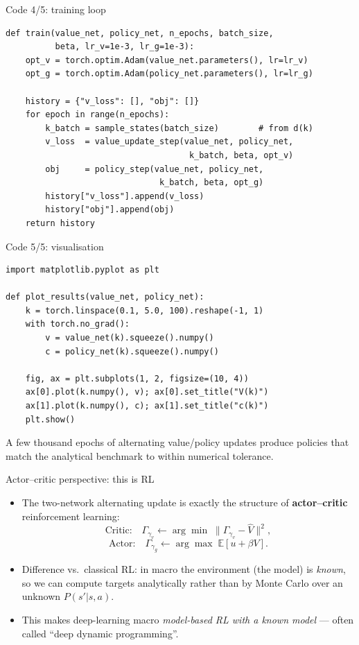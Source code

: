 \documentclass[10pt,english,aspectratio=169]{beamer}
\begin{document}
\begin{frame}[fragile]{Code 4/5: training loop}
\begin{lstlisting}
def train(value_net, policy_net, n_epochs, batch_size,
          beta, lr_v=1e-3, lr_g=1e-3):
    opt_v = torch.optim.Adam(value_net.parameters(), lr=lr_v)
    opt_g = torch.optim.Adam(policy_net.parameters(), lr=lr_g)

    history = {"v_loss": [], "obj": []}
    for epoch in range(n_epochs):
        k_batch = sample_states(batch_size)        # from d(k)
        v_loss  = value_update_step(value_net, policy_net,
                                     k_batch, beta, opt_v)
        obj     = policy_step(value_net, policy_net,
                               k_batch, beta, opt_g)
        history["v_loss"].append(v_loss)
        history["obj"].append(obj)
    return history
\end{lstlisting}
\end{frame}

\begin{frame}[fragile]{Code 5/5: visualisation}
\begin{lstlisting}
import matplotlib.pyplot as plt

def plot_results(value_net, policy_net):
    k = torch.linspace(0.1, 5.0, 100).reshape(-1, 1)
    with torch.no_grad():
        v = value_net(k).squeeze().numpy()
        c = policy_net(k).squeeze().numpy()

    fig, ax = plt.subplots(1, 2, figsize=(10, 4))
    ax[0].plot(k.numpy(), v); ax[0].set_title("V(k)")
    ax[1].plot(k.numpy(), c); ax[1].set_title("c(k)")
    plt.show()
\end{lstlisting}
\medskip
A few thousand epochs of alternating value/policy updates produce policies that match the analytical benchmark to within numerical tolerance.
\end{frame}

\begin{frame}{Actor--critic perspective: this is RL}
\begin{itemize}
\item The two-network alternating update is exactly the structure of \textbf{actor--critic} reinforcement learning:
\[
\text{Critic:}\quad \Gamma_{\gamma_v} \leftarrow \arg\min \;\big\|\Gamma_{\gamma_v} - \hat V\big\|^2,
\]
\[
\text{Actor:}\quad \Gamma_{\gamma_g} \leftarrow \arg\max \;\mathbb{E}\!\left[u + \beta V\right].
\]
\medskip
\item Difference vs.\ classical RL: in macro the environment (the model) is \emph{known}, so we can compute targets analytically rather than by Monte Carlo over an unknown $P(s'|s,a)$.
\medskip
\item This makes deep-learning macro \emph{model-based RL with a known model} --- often called ``deep dynamic programming''.
\end{itemize}
\end{frame}
\end{document}
